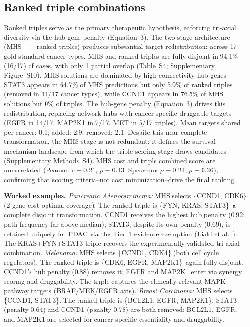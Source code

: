 \documentclass[11pt]{article}
\begin{document}
\subsection*{Ranked triple combinations}
Ranked triples serve as the primary therapeutic hypothesis, enforcing tri-axial diversity via the hub-gene penalty (Equation~3). The two-stage architecture (MHS $\to$ ranked triples) produces substantial target redistribution: across 17 gold-standard cancer types, MHS and ranked triples are fully disjoint in 94.1\% (16/17) of cases, with only 1 partial overlap (Table~S4; Supplementary Figure~S10). MHS solutions are dominated by high-connectivity hub genes--STAT3 appears in 64.7\% of MHS predictions but only 5.9\% of ranked triples (removed in 11/17 cancer types), while CCND1 appears in 76.5\% of MHS solutions but 0\% of triples. The hub-gene penalty (Equation~3) drives this redistribution, replacing network hubs with cancer-specific druggable targets (EGFR in 14/17, MAP2K1 in 7/17, MET in 5/17 triples). Mean targets shared per cancer: 0.1; added: 2.9; removed: 2.1. Despite this near-complete transformation, the MHS stage is not redundant: it defines the survival mechanism landscape from which the triple scoring stage draws candidates (Supplementary Methods~S4). MHS cost and triple combined score are uncorrelated (Pearson $r = 0.21$, $p = 0.43$; Spearman $\rho = 0.24$, $p = 0.36$), confirming that scoring criteria--not cost minimization--drive the final ranking.

\textbf{Worked examples.}
\emph{Pancreatic Adenocarcinoma:} MHS selects \{CCND1, CDK6\} (2-gene cost-optimal coverage). The ranked triple is \{FYN, KRAS, STAT3\}--a complete disjoint transformation. CCND1 receives the highest hub penalty (0.92; path frequency far above median); STAT3, despite its own penalty (0.69), is retained uniquely for PDAC via the Tier~1 evidence exemption (Liaki et al.~\cite{Liaki2025}). The KRAS+FYN+STAT3 triple recovers the experimentally validated tri-axial combination.
\emph{Melanoma:} MHS selects \{CCND1, CDK4\} (both cell cycle regulators). The ranked triple is \{CDK6, EGFR, MAP2K1\}--again fully disjoint. CCND1's hub penalty (0.88) removes it; EGFR and MAP2K1 enter via synergy scoring and druggability. The triple captures the clinically relevant MAPK pathway targets (BRAF/MEK/EGFR axis).
\emph{Breast Carcinoma:} MHS selects \{CCND1, STAT3\}. The ranked triple is \{BCL2L1, EGFR, MAP2K1\}. STAT3 (penalty 0.64) and CCND1 (penalty 0.78) are both removed; BCL2L1, EGFR, and MAP2K1 are selected for cancer-specific essentiality and druggability.
\end{document}
